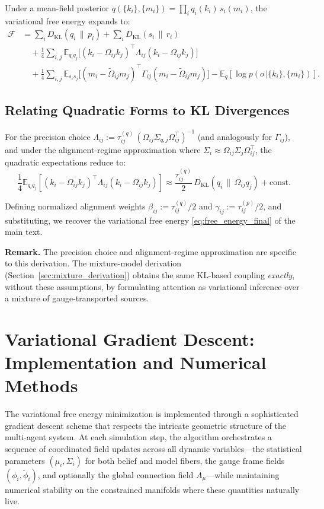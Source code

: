 \documentclass[twoside,11pt]{article}
\begin{document}
Under a mean-field posterior $q(\{k_i\},\{m_i\})=\prod_i q_i(k_i)\,s_i(m_i)$, the variational free energy expands to:
\begin{equation}
\begin{aligned}
\mathcal{F}
&=\sum_i D_{\mathrm{KL}}(q_i\,\|\,p_i)
+\sum_i D_{\mathrm{KL}}(s_i\,\|\,r_i)\\
&\quad+\frac{1}{4}\sum_{i,j}\mathbb{E}_{q_i q_j}
\!\big[(k_i-\Omega_{ij}k_j)^\top\Lambda_{ij}(k_i-\Omega_{ij}k_j)\big]\\
&\quad+\frac{1}{4}\sum_{i,j}\mathbb{E}_{s_i s_j}
\!\big[(m_i-\tilde{\Omega}_{ij}m_j)^\top\Gamma_{ij}(m_i-\tilde{\Omega}_{ij}m_j)\big]
-\mathbb{E}_q[\log p(o\,|\{k_i\},\{m_i\})].
\end{aligned}
\label{eq:free_energy_expanded}
\end{equation}

\subsection{Relating Quadratic Forms to KL Divergences}

For the precision choice $\Lambda_{ij}:=\tau^{(q)}_{ij}\,(\Omega_{ij}\Sigma_{q,j}\Omega_{ij}^\top)^{-1}$ (and analogously for $\Gamma_{ij}$), and under the alignment-regime approximation where $\Sigma_i \approx \Omega_{ij}\Sigma_j\Omega_{ij}^\top$, the quadratic expectations reduce to:
\begin{equation}
\frac{1}{4}\mathbb{E}_{q_i q_j}
[(k_i-\Omega_{ij}k_j)^\top\Lambda_{ij}(k_i-\Omega_{ij}k_j)]
\approx
\frac{\tau^{(q)}_{ij}}{2}\,D_{\mathrm{KL}}(q_i\,\|\,\Omega_{ij}q_j)+\text{const}.
\label{eq:belief_kl_relation}
\end{equation}

Defining normalized alignment weights $\beta_{ij}:=\tau^{(q)}_{ij}/2$ and $\gamma_{ij}:=\tau^{(p)}_{ij}/2$, and substituting, we recover the variational free energy \eqref{eq:free_energy_final} of the main text.

\textbf{Remark.} The precision choice and alignment-regime approximation are specific to this derivation. The mixture-model derivation (Section~\ref{sec:mixture_derivation}) obtains the same KL-based coupling \emph{exactly}, without these assumptions, by formulating attention as variational inference over a mixture of gauge-transported sources.


\section{Variational Gradient Descent: Implementation and Numerical Methods}
The variational free energy minimization is implemented through a sophisticated gradient descent scheme that respects the intricate geometric structure of the multi-agent system. At each simulation step, the algorithm orchestrates a sequence of coordinated field updates across all dynamic variables—the statistical parameters $(\mu_i, \Sigma_i)$ for both belief and model fibers, the gauge frame fields $(\phi_i, \tilde{\phi}_i)$, and optionally the global connection field $A_\mu$—while maintaining numerical stability on the constrained manifolds where these quantities naturally live.
\end{document}

